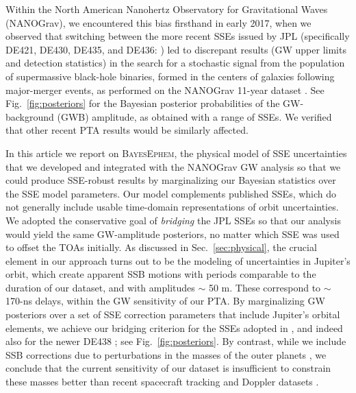 \documentclass[iop,apj,twocolappendix]{emulateapj}
\begin{document}
Within the North American Nanohertz Observatory for Gravitational Waves (NANOGrav), we encountered this bias firsthand in early 2017, when we observed that switching between the more recent SSEs issued by JPL (specifically DE421, DE430, DE435, and DE436: \citealt{2009IPNPR.178C...1F,2014IPNPR.196C...1F,de435,de436}) led to discrepant results (GW upper limits and detection statistics) in the search for a stochastic signal from the population of supermassive black-hole binaries, formed in the centers of galaxies following major-merger events, as performed on the NANOGrav 11-year dataset \citep{2018ApJS..235...37A,2018ApJ...859...47A}.
See Fig.\ \ref{fig:posteriors} for the Bayesian posterior probabilities of the GW-background (GWB) amplitude, as obtained with a range of SSEs. We verified that other recent PTA results \citep{2015Sci...349.1522S,2016ApJ...821...13A} would be similarly affected.

In this article we report on \textsc{BayesEphem}, the physical model of SSE uncertainties that we developed and integrated with the NANOGrav GW analysis so that we could produce SSE-robust results \citep{2018ApJ...859...47A} by marginalizing our Bayesian statistics over the SSE model parameters. 
Our model complements published SSEs, which do not generally include usable time-domain representations of orbit uncertainties.
We adopted the conservative goal of \emph{bridging} the JPL SSEs so that our analysis would yield the same GW-amplitude posteriors, no matter which SSE was used to offset the TOAs initially.
As discussed in Sec.\ \ref{sec:physical}, the crucial element in our approach turns out to be the modeling of uncertainties in Jupiter's orbit, which create apparent SSB motions with periods comparable to the duration of our dataset, and with amplitudes $\sim$ 50 m. These correspond to $\sim$ 170-ns delays, within the GW sensitivity of our PTA.
By marginalizing GW posteriors over a set of SSE correction parameters that include Jupiter's orbital elements, we achieve our bridging criterion for the SSEs adopted in \cite{2018ApJ...859...47A}, and indeed also for the newer DE438 \citep{de438}; see Fig.\ \ref{fig:posteriors}.
By contrast, while we include SSB corrections due to perturbations in the masses of the outer planets \citep{2010ApJ...720L.201C}, we conclude that the current sensitivity of our dataset is insufficient to constrain these masses better than recent spacecraft tracking and Doppler datasets \citep{jh+2000,2018MNRAS.481.5501C,2006AJ....132.2520J,2014AJ....148...76J,2009AJ....137.4322J}.
\end{document}
